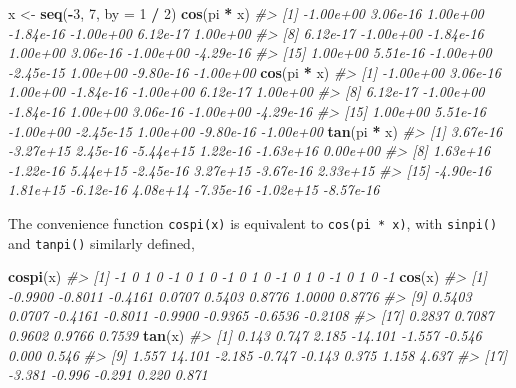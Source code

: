 \documentclass[]{book}
\newenvironment{Shaded}{\begin{snugshade}}{\end{snugshade}}
\newcommand{\CommentTok}[1]{\textcolor[rgb]{0.56,0.35,0.01}{\textit{#1}}}
\newcommand{\DataTypeTok}[1]{\textcolor[rgb]{0.13,0.29,0.53}{#1}}
\newcommand{\DecValTok}[1]{\textcolor[rgb]{0.00,0.00,0.81}{#1}}
\newcommand{\KeywordTok}[1]{\textcolor[rgb]{0.13,0.29,0.53}{\textbf{#1}}}
\newcommand{\NormalTok}[1]{#1}
\newcommand{\OperatorTok}[1]{\textcolor[rgb]{0.81,0.36,0.00}{\textbf{#1}}}
\newcommand{\StringTok}[1]{\textcolor[rgb]{0.31,0.60,0.02}{#1}}
\theoremstyle{plain}
\theoremstyle{remark}
\begin{document}
\begin{Shaded}
\begin{Highlighting}[]
\NormalTok{x <-}\StringTok{ }\KeywordTok{seq}\NormalTok{(}\OperatorTok{-}\DecValTok{3}\NormalTok{, }\DecValTok{7}\NormalTok{, }\DataTypeTok{by =} \DecValTok{1} \OperatorTok{/}\StringTok{ }\DecValTok{2}\NormalTok{)}
\KeywordTok{cos}\NormalTok{(pi }\OperatorTok{*}\StringTok{ }\NormalTok{x)}
\CommentTok{#>  [1] -1.00e+00  3.06e-16  1.00e+00 -1.84e-16 -1.00e+00  6.12e-17  1.00e+00}
\CommentTok{#>  [8]  6.12e-17 -1.00e+00 -1.84e-16  1.00e+00  3.06e-16 -1.00e+00 -4.29e-16}
\CommentTok{#> [15]  1.00e+00  5.51e-16 -1.00e+00 -2.45e-15  1.00e+00 -9.80e-16 -1.00e+00}
\KeywordTok{cos}\NormalTok{(pi }\OperatorTok{*}\StringTok{ }\NormalTok{x)}
\CommentTok{#>  [1] -1.00e+00  3.06e-16  1.00e+00 -1.84e-16 -1.00e+00  6.12e-17  1.00e+00}
\CommentTok{#>  [8]  6.12e-17 -1.00e+00 -1.84e-16  1.00e+00  3.06e-16 -1.00e+00 -4.29e-16}
\CommentTok{#> [15]  1.00e+00  5.51e-16 -1.00e+00 -2.45e-15  1.00e+00 -9.80e-16 -1.00e+00}
\KeywordTok{tan}\NormalTok{(pi }\OperatorTok{*}\StringTok{ }\NormalTok{x)}
\CommentTok{#>  [1]  3.67e-16 -3.27e+15  2.45e-16 -5.44e+15  1.22e-16 -1.63e+16  0.00e+00}
\CommentTok{#>  [8]  1.63e+16 -1.22e-16  5.44e+15 -2.45e-16  3.27e+15 -3.67e-16  2.33e+15}
\CommentTok{#> [15] -4.90e-16  1.81e+15 -6.12e-16  4.08e+14 -7.35e-16 -1.02e+15 -8.57e-16}
\end{Highlighting}
\end{Shaded}

The convenience function \texttt{cospi(x)} is equivalent to \texttt{cos(pi\ *\ x)}, with \texttt{sinpi()} and \texttt{tanpi()} similarly defined,

\begin{Shaded}
\begin{Highlighting}[]
\KeywordTok{cospi}\NormalTok{(x)}
\CommentTok{#>  [1] -1  0  1  0 -1  0  1  0 -1  0  1  0 -1  0  1  0 -1  0  1  0 -1}
\KeywordTok{cos}\NormalTok{(x)}
\CommentTok{#>  [1] -0.9900 -0.8011 -0.4161  0.0707  0.5403  0.8776  1.0000  0.8776}
\CommentTok{#>  [9]  0.5403  0.0707 -0.4161 -0.8011 -0.9900 -0.9365 -0.6536 -0.2108}
\CommentTok{#> [17]  0.2837  0.7087  0.9602  0.9766  0.7539}
\KeywordTok{tan}\NormalTok{(x)}
\CommentTok{#>  [1]   0.143   0.747   2.185 -14.101  -1.557  -0.546   0.000   0.546}
\CommentTok{#>  [9]   1.557  14.101  -2.185  -0.747  -0.143   0.375   1.158   4.637}
\CommentTok{#> [17]  -3.381  -0.996  -0.291   0.220   0.871}
\end{Highlighting}
\end{Shaded}
\end{document}
